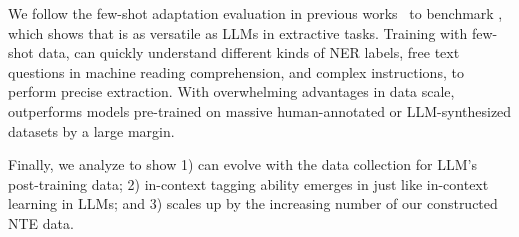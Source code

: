 We follow the few-shot adaptation evaluation in previous works~\citep{multinerd,NuNER} to benchmark \our, which shows that \our is as versatile as LLMs in extractive tasks. Training with few-shot data, \our can quickly understand different kinds of NER labels, free text questions in machine reading comprehension, and complex instructions, to perform precise extraction. With overwhelming advantages in data scale, \our outperforms models pre-trained on massive human-annotated or LLM-synthesized datasets by a large margin.

Finally, we analyze to show 1) \our can evolve with the data collection for LLM's post-training data; 2) in-context tagging ability emerges in \our just like in-context learning in LLMs; and 3) \our scales up by the increasing number of our constructed NTE data.
